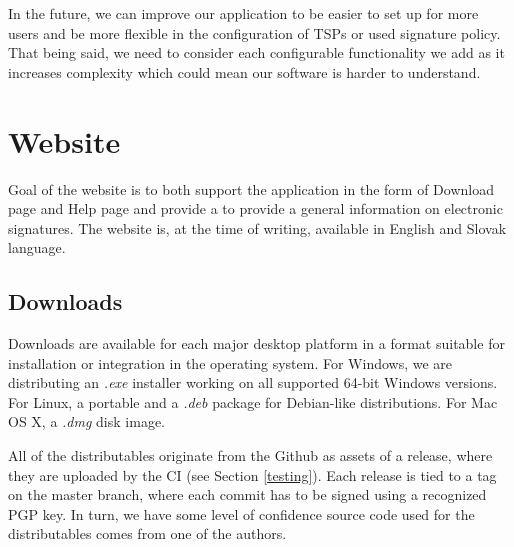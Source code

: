 \documentclass[thesismargins, english, thesislinespacing, onelinechapterstyle, upjsfrontpage]{rnthesis}
\begin{document}
In the future, we can improve our application to be easier to set up for more users and be more flexible in the configuration of TSPs or used signature policy.
That being said, we need to consider each configurable functionality we add as it increases complexity which could mean our software is harder to understand.

\section{Website}

Goal of the website is to both support the application in the form of Download page and Help page and provide a to provide a general information on electronic signatures.
The website is, at the time of writing, available in English and Slovak language.


\subsection{Downloads}

Downloads are available for each major desktop platform in a format suitable for installation or integration in the operating system.
For Windows, we are distributing an \textit{.exe} installer working on all supported 64-bit Windows versions.
For Linux, a portable  and a \textit{.deb} package for Debian-like distributions.
For Mac OS X, a \textit{.dmg} disk image.

All of the distributables originate from the Github as assets of a release, where they are uploaded by the CI (see Section \ref{testing}).
Each release is tied to a tag on the master branch, where each commit has to be signed using a recognized PGP key.
In turn, we have some level of confidence source code used for the distributables comes from one of the authors.
\end{document}
